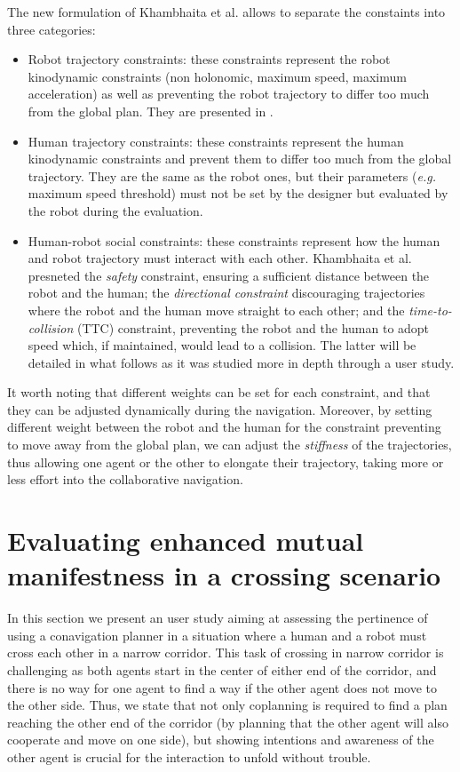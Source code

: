 \documentclass[a4paper,11pt,twoside]{StyleThese}
\begin{document}
The new formulation of Khambhaita et al. allows to separate the constaints into three categories:
\begin{itemize}
\item Robot trajectory constraints: these constraints represent the robot kinodynamic constraints (non holonomic, maximum speed, maximum acceleration) as well as preventing the robot trajectory to differ too much from the global plan. They are presented in \cite{rosmann_efficient_2013}.
\item Human trajectory constraints: these constraints represent the human kinodynamic constraints and prevent them to differ too much from the global trajectory. They are the same as the robot ones, but their parameters (\textit{e.g.} maximum speed threshold) must not be set by the designer but evaluated by the robot during the evaluation.
\item Human-robot social constraints: these constraints represent how the human and robot trajectory must interact with each other. Khambhaita et al. presneted the \textit{safety} constraint, ensuring a sufficient distance between the robot and the human; the \textit{directional constraint} discouraging trajectories where the robot and the human move straight to each other; and the \textit{time-to-collision} (TTC) constraint, preventing the robot and the human to adopt speed which, if maintained, would lead to a collision. The latter will be detailed in what follows as it was studied more in depth through a user study.
\end{itemize}

It worth noting that different weights can be set for each constraint, and that they can be adjusted dynamically during the navigation. Moreover, by setting different weight between the robot and the human for the constraint preventing to move away from the global plan, we can adjust the \textit{stiffness} of the trajectories, thus allowing one agent or the other to elongate their trajectory, taking more or less effort into the collaborative navigation.

\section{Evaluating enhanced mutual manifestness in a crossing scenario}
In this section we present an user study aiming at assessing the pertinence of using a conavigation planner in a situation where a human and a robot must cross each other in a narrow corridor. This task of crossing in narrow corridor is challenging as both agents start in the center of either end of the corridor, and there is no way for one agent to find a way if the other agent does not move to the other side. Thus, we state that not only coplanning is required to find a plan reaching the other end of the corridor (by planning that the other agent will also cooperate and move on one side), but showing intentions and awareness of the other agent is crucial for the interaction to unfold without trouble.
\end{document}
